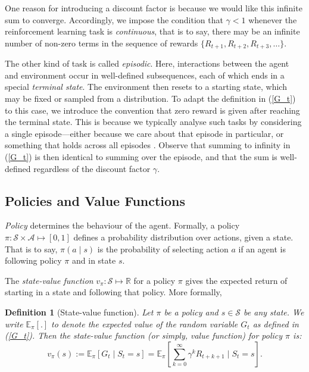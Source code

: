 \documentclass[11pt, a4paper, bibliography=totoc]{report}
\newcommand{\reals}{\mathbb{R}}
\newcommand{\E}[2]{\mathbb{E}_{#1} \left[ #2 \right] }
\newtheorem{definition}{Definition}
\begin{document}
One reason for introducing a discount factor is because we would like this infinite sum to converge. Accordingly, we impose the condition that $ \gamma < 1 $ whenever the reinforcement learning task is \textit{continuous}, that is to say, there may be an infinite number of non-zero terms in the sequence of rewards $ \{R_{t+1}, R_{t+2}, R_{t+3}, \dots \} $.

The other kind of task is called \textit{episodic}. Here, interactions between the agent and environment occur in well-defined subsequences, each of which ends in a special \textit{terminal state}. The environment then resets to a starting state, which may be fixed or sampled from a distribution. To adapt the definition in (\ref{G_t}) to this case, we introduce the convention that zero reward is given after reaching the terminal state. This is because we typically analyse such tasks by considering a single episode---either because we care about that episode in particular, or something that holds across all episodes \cite[p.~57]{Sutton2018}. Observe that summing to infinity in (\ref{G_t}) is then identical to summing over the episode, and that the sum is well-defined regardless of the discount factor $ \gamma $.

\subsection{Policies and Value Functions} \label{policy_value_functions}
\textit{Policy} determines the behaviour of the agent. Formally, a policy $ \pi : \mathcal{S} \times \mathcal{A} \mapsto [0,1] $ defines a probability distribution over actions, given a state. That is to say, $ \pi(a \mid s) $ is the probability of selecting action $ a $ if an agent is following policy $ \pi $ and in state $ s $.

The \textit{state-value function} $ v_\pi : \mathcal{S} \mapsto \reals $ for a policy $ \pi $ gives the expected return of starting in a state and following that policy. More formally,
\begin{definition}[State-value function]
	Let $ \pi $ be a policy and $ s \in \mathcal{S} $ be any state. We write $ \E{\pi}{.}$ to denote the expected value of the random variable $ G_t $ as defined in (\ref{G_t}). Then the state-value function (or simply, value function) for policy $ \pi $ is:
	\begin{equation} \label{v_pi}
	v_\pi(s) := \E{\pi}{G_t \mid S_t = s} = \E{\pi}{\sum_{k=0}^{\infty} \gamma^k R_{t+k+1} \mid S_t = s}.
	\end{equation}
\end{definition}
\end{document}
